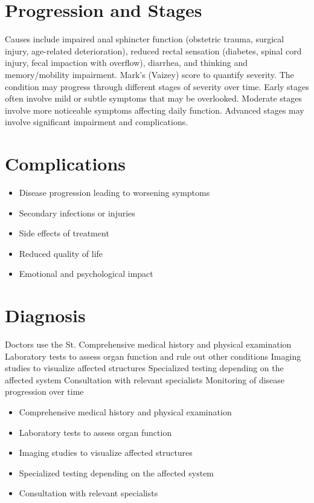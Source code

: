\section{Progression and Stages}
Causes include impaired anal sphincter function (obstetric trauma, surgical injury, age-related deterioration), reduced rectal sensation (diabetes, spinal cord injury, fecal impaction with overflow), diarrhea, and thinking and memory/mobility impairment. Mark's (Vaizey) score to quantify severity. The condition may progress through different stages of severity over time. Early stages often involve mild or subtle symptoms that may be overlooked. Moderate stages involve more noticeable symptoms affecting daily function. Advanced stages may involve significant impairment and complications.
\section{Complications}
\begin{itemize}[noitemsep]
  \item Disease progression leading to worsening symptoms
  \item Secondary infections or injuries
  \item Side effects of treatment
  \item Reduced quality of life
  \item Emotional and psychological impact
\end{itemize}
\section{Diagnosis}
Doctors use the St. Comprehensive medical history and physical examination Laboratory tests to assess organ function and rule out other conditions Imaging studies to visualize affected structures Specialized testing depending on the affected system Consultation with relevant specialists Monitoring of disease progression over time

\begin{itemize}[noitemsep]
  \item Comprehensive medical history and physical examination
  \item Laboratory tests to assess organ function
  \item Imaging studies to visualize affected structures
  \item Specialized testing depending on the affected system
  \item Consultation with relevant specialists
\end{itemize}
